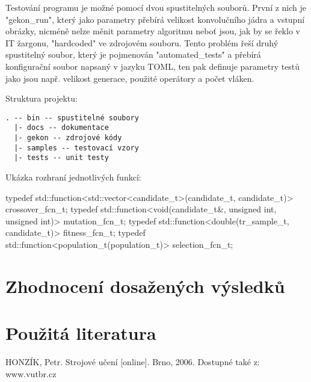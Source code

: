 \documentclass[a4paper,11pt]{scrartcl}
\begin{document}
Testování programu je možné pomocí dvou spustitelných souborů. První z nich je "gekon\_run", který jako parametry přebírá velikost konvolučního jádra a vstupní obrázky, nicméně nelze měnit parametry algoritmu neboť jsou, jak by se řeklo v IT žargonu, "hardcoded" ve zdrojovém souboru. Tento problém řeší druhý spustitelný soubor, který je pojmenován "automated\_tests" a přebírá konfigurační soubor napsaný v jazyku TOML, ten pak definuje parametry testů jako jsou např. velikost generace, použité operátory a počet vláken.

Struktura projektu:
\begin{verbatim}
. -- bin -- spustitelné soubory
  |- docs -- dokumentace
  |- gekon -- zdrojové kódy
  |- samples -- testovací vzory
  |- tests -- unit testy
\end{verbatim}

Ukázka rozhraní jednotlivých funkcí:
\begin{cppcode}
typedef std::function<std::vector<candidate_t>(candidate_t, candidate_t)> crossover_fcn_t;
typedef std::function<void(candidate_t&, unsigned int, unsigned int)> mutation_fcn_t;
typedef std::function<double(tr_sample_t, candidate_t)> fitness_fcn_t;
typedef std::function<population_t(population_t)> selection_fcn_t;
\end{cppcode}

\section{Zhodnocení dosažených výsledků}

\section{Použitá literatura}

HONZÍK, Petr. Strojové učení [online]. Brno, 2006. Dostupné také z: www.vutbr.cz
\end{document}

